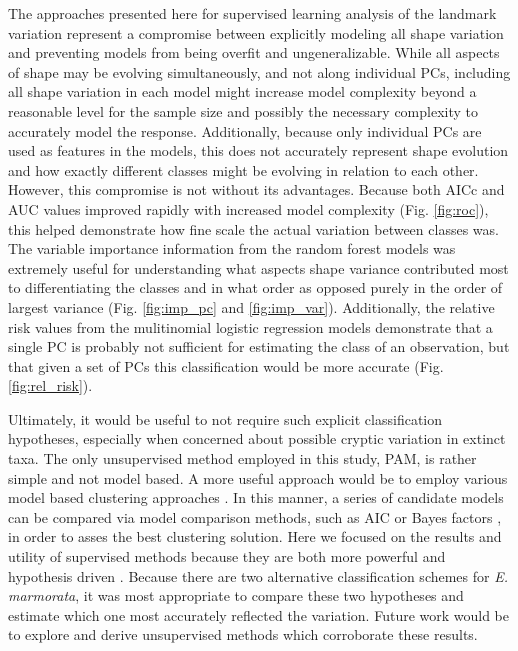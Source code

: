 \documentclass[12pt,letterpaper]{article}\usepackage{graphicx, color}
\begin{document}
The approaches presented here for supervised learning analysis of the landmark variation represent a compromise between explicitly modeling all shape variation and preventing models from being overfit and ungeneralizable. While all aspects of shape may be evolving simultaneously, and not along individual PCs, including all shape variation in each model might increase model complexity beyond a reasonable level for the sample size and possibly the necessary complexity to accurately model the response. Additionally, because only individual PCs are used as features in the models, this does not accurately represent shape evolution and how exactly different classes might be evolving in relation to each other. However, this compromise is not without its advantages. Because both AICc and AUC values improved rapidly with increased model complexity (Fig. \ref{fig:roc}), this helped demonstrate how fine scale the actual variation between classes was. The variable importance information from the random forest models was extremely useful for understanding what aspects shape variance contributed most to differentiating the classes and in what order as opposed purely in the order of largest variance (Fig. \ref{fig:imp_pc} and \ref{fig:imp_var}). Additionally, the relative risk values from the mulitinomial logistic regression models demonstrate that a single PC is probably not sufficient for estimating the class of an observation, but that given a set of PCs this classification would be more accurate (Fig. \ref{fig:rel_risk}).

Ultimately, it would be useful to not require such explicit classification hypotheses, especially when concerned about possible cryptic variation in extinct taxa. The only unsupervised method employed in this study, PAM, is rather simple and not model based. A more useful approach would be to employ various model based clustering approaches \citep{Fraley2002,Zhong2003,VanBocxlaer2013}. In this manner, a series of candidate models can be compared via model comparison methods, such as AIC or Bayes factors \citep{Fraley2002}, in order to asses the best clustering solution. %
Here we focused on the results and utility of supervised methods because they are both more powerful and hypothesis driven \citep{Hastie2009}. Because there are two alternative classification schemes for \textit{E. marmorata}, it was most appropriate to compare these two hypotheses and estimate which one most accurately reflected the variation. Future work would be to explore and derive unsupervised methods which corroborate these results.
\end{document}
